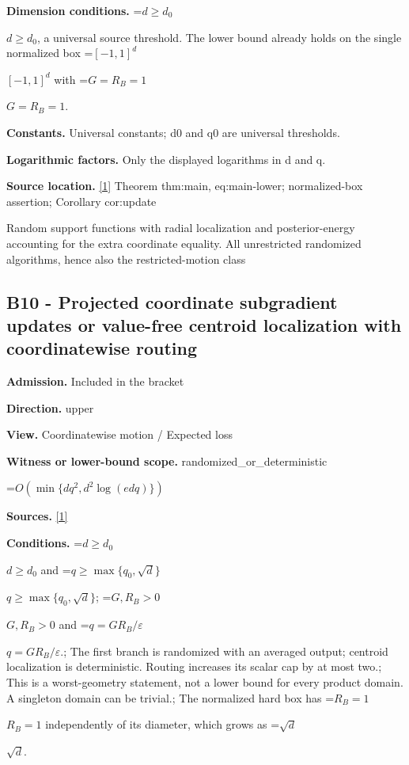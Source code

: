 \documentclass[10pt,a4paper]{article}
\newcommand{\AtlasMath}[1]{\par\begingroup\centering\setbox0=\hbox{$\displaystyle #1$}\ifdim\wd0>1.4\linewidth\typeout{ATLAS WIDE FORMULA: \the\wd0}\fi\ifdim\wd0>\linewidth\resizebox{\linewidth}{!}{\box0}\else\box0\fi\par\endgroup}
\newcommand{\AtlasInlineMath}[1]{\begingroup\setbox0=\hbox{$#1$}\ifdim\wd0>.4\linewidth\endgroup\AtlasMath{#1}\else\endgroup$#1$\fi}
\begin{document}
\textbf{Dimension conditions.} \AtlasInlineMath{d\ge d_0}, a universal source threshold. The lower bound already holds on the single normalized box \AtlasInlineMath{[-1,1]^d} with \AtlasInlineMath{G=R_B=1}.



\textbf{Constants.} Universal constants; d0 and q0 are universal thresholds.



\textbf{Logarithmic factors.} Only the displayed logarithms in d and q.



\textbf{Source location.} \href{https://github.com/WU-Wendao/Colombo/blob/main/colombo_sensorium/Complexity_altas/data/sources/colombo/U03/manuscript.pdf}{[1]} Theorem thm:main, eq:main-lower; normalized-box assertion; Corollary cor:update



Random support functions with radial localization and posterior-energy accounting for the extra coordinate equality. All unrestricted randomized algorithms, hence also the restricted-motion class



\subsection{B10 - Projected coordinate subgradient updates or value-free centroid localization with coordinatewise routing}


\textbf{Admission.} Included in the bracket



\textbf{Direction.} upper



\textbf{View.} Coordinatewise motion / Expected loss



\textbf{Witness or lower-bound scope.} randomized\_or\_deterministic



\AtlasMath{O(\min\{dq^2,d^2\log(edq)\})}


\textbf{Sources.} \href{https://github.com/WU-Wendao/Colombo/blob/main/colombo_sensorium/Complexity_altas/data/sources/colombo/U03/manuscript.pdf}{[1]}



\textbf{Conditions.} \AtlasInlineMath{d\ge d_0} and \AtlasInlineMath{q\ge\max\{q_0,\sqrt d\}}; \AtlasInlineMath{G,R_B>0} and \AtlasInlineMath{q=GR_B/\varepsilon}.; The first branch is randomized with an averaged output; centroid localization is deterministic. Routing increases its scalar cap by at most two.; This is a worst-geometry statement, not a lower bound for every product domain. A singleton domain can be trivial.; The normalized hard box has \AtlasInlineMath{R_B=1} independently of its diameter, which grows as \AtlasInlineMath{\sqrt d}.
\end{document}
